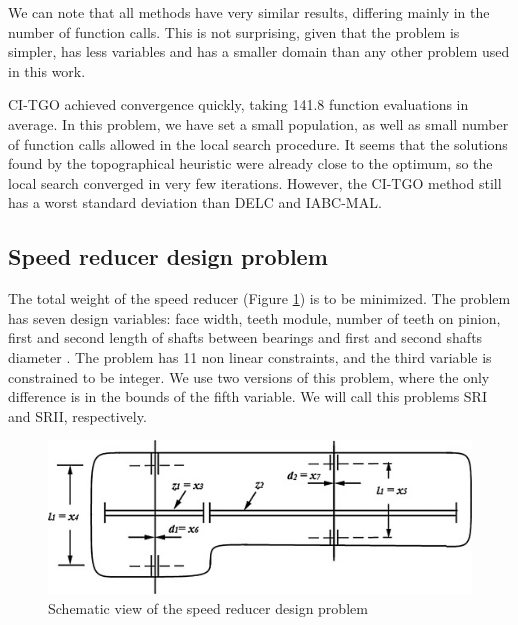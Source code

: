 

We can note that all methods have very similar results, differing mainly in the number of function calls. This is not surprising, given that the problem is simpler, has less variables and has a smaller domain than any other problem used in this work.

CI-TGO achieved convergence quickly, taking 141.8 function evaluations in average. In this problem, we have set a small population, as well as small number of function calls allowed in the local search procedure. It seems that the solutions found by the topographical heuristic were already close to the optimum, so the local search converged in very few iterations. However, the CI-TGO method still has a worst standard deviation than DELC and IABC-MAL.





\subsection{Speed reducer design problem}

The total weight of the speed reducer (Figure \ref{fig:SR}) is to be minimized. The problem has seven design variables: face width, teeth module, number of teeth on pinion, first and second length of shafts between bearings and first and second shafts diameter \citep{SR}. The problem has 11 non linear constraints, and the third variable is constrained to be integer. We use two versions of this problem, where the only difference is in the bounds of the fifth variable. We will call this problems SRI and SRII, respectively.


\begin{figure}[h]
\begin{center}
\includegraphics[scale=0.6]{Imgs/SR.jpg}
\end{center}
\captionsetup{justification=centering}
\caption{Schematic view of the speed reducer design problem}\label{fig:SR}
\end{figure}

